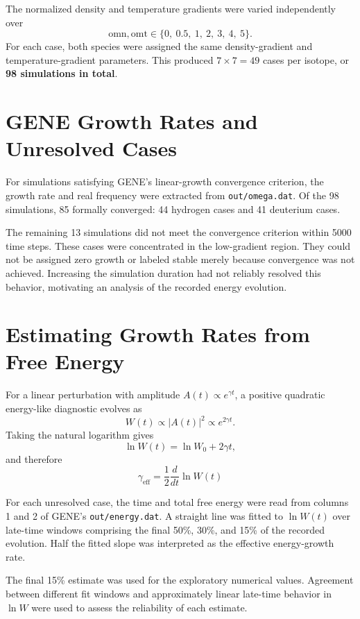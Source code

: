 \documentclass[10pt,letterpaper]{article}
\begin{document}
The normalized density and temperature gradients
were varied independently over
\[
\mathrm{omn},\mathrm{omt}
\in\{0,\ 0.5,\ 1,\ 2,\ 3,\ 4,\ 5\}.
\]
For each case, both species were assigned the same
density-gradient and temperature-gradient parameters.
This produced $7\times7=49$ cases per isotope,
or \textbf{98 simulations in total}.

\section{GENE Growth Rates and Unresolved Cases}

For simulations satisfying GENE's linear-growth
convergence criterion, the growth rate and real
frequency were extracted from \texttt{out/omega.dat}.
Of the 98 simulations, 85 formally converged:
44 hydrogen cases and 41 deuterium cases.

The remaining 13 simulations did not meet the
convergence criterion within 5000 time steps.
These cases were concentrated in the low-gradient
region. They could not be assigned zero growth
or labeled stable merely because convergence was
not achieved. Increasing the simulation duration
had not reliably resolved this behavior, motivating
an analysis of the recorded energy evolution.

\section{Estimating Growth Rates from Free Energy}

For a linear perturbation with amplitude
$A(t)\propto e^{\gamma t}$, a positive quadratic
energy-like diagnostic evolves as
\[
W(t)\propto |A(t)|^2\propto e^{2\gamma t}.
\]
Taking the natural logarithm gives
\[
\ln W(t)=\ln W_0+2\gamma t,
\]
and therefore
\begin{equation}
\boxed{
\gamma_{\mathrm{eff}}
=\frac{1}{2}\frac{d}{dt}\ln W(t)
}
\label{eq:energygrowth}
\end{equation}

For each unresolved case, the time and total
free energy were read from columns 1 and 2
of GENE's \texttt{out/energy.dat}.
A straight line was fitted to $\ln W(t)$
over late-time windows comprising the final
50\%, 30\%, and 15\% of the recorded evolution.
Half the fitted slope was interpreted as the
effective energy-growth rate.

The final 15\% estimate was used for the
exploratory numerical values. Agreement between
different fit windows and approximately linear
late-time behavior in $\ln W$ were used to assess
the reliability of each estimate.
\end{document}
